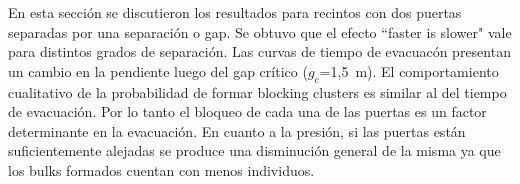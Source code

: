 En esta sección se discutieron los resultados para recintos con dos puertas separadas por una separación o gap. Se obtuvo que el efecto ``faster is slower" vale para distintos grados de separación. Las curvas de tiempo de evacuacón presentan un cambio en la pendiente luego del gap crítico ($g_c$=1,5~m). El comportamiento cualitativo de la probabilidad de formar blocking clusters es similar al del tiempo de evacuación. Por lo tanto el bloqueo de cada una de las puertas es un factor determinante en la evacuación. En cuanto a la presión, si las puertas están suficientemente alejadas se produce una disminución general de la misma ya que los bulks formados cuentan con menos individuos. 
